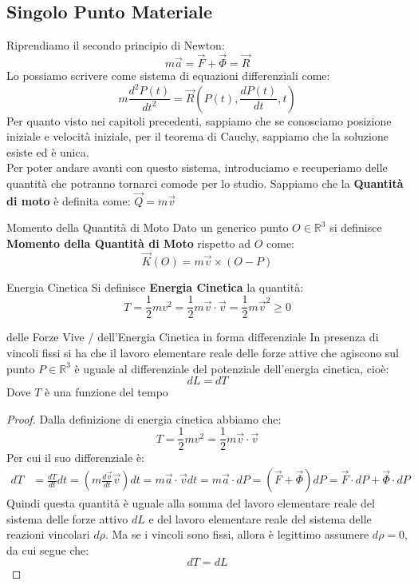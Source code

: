 \documentclass[11pt,a4paper,twoside]{article}
\theoremstyle{definition}
\begin{document}
\subsection{Singolo Punto Materiale}

Riprendiamo il secondo principio di Newton:
\[ m\vec a = \vec F + \vec \Phi = \vec R \]
Lo possiamo scrivere come sistema di equazioni differenziali come:
\[ m\frac{d^2P(t)}{dt^2}= \vec R\left( P(t), \frac{dP(t)}{dt}, t \right) \]
Per quanto visto nei capitoli precedenti, sappiamo che se conosciamo posizione iniziale e velocità iniziale, per il teorema di Cauchy, sappiamo che la soluzione esiste ed è unica.\\
Per poter andare avanti con questo sistema, introduciamo e recuperiamo delle quantità che potranno tornarci comode per lo studio. Sappiamo che la \textbf{Quantità di moto} è definita come: $\vec Q = m\vec v$

\begin{defn}{Momento della Quantità di Moto}{}
	Dato un generico punto $O \in \mathbb R^3$ si definisce \textbf{Momento della Quantità di Moto} rispetto ad $O$ come:
	\[ \vec K(O) = m\vec v \times (O-P) \]
\end{defn}

\begin{defn}{Energia Cinetica}{}
	Si definisce \textbf{Energia Cinetica} la quantità:
	\[ T = \frac 12 mv^2 = \frac 12 m \vec v \cdot \vec v = \frac 12 m \vec v^2 \geq 0 \]
\end{defn}

\begin{thm}{delle Forze Vive / dell'Energia Cinetica in forma differenziale}{}\label{Forze Vive}
	In presenza di vincoli fissi si ha che il lavoro elementare reale delle forze attive che agiscono sul punto $P \in \mathbb R^3$ è uguale al differenziale del potenziale dell'energia cinetica, cioè:
	\[ dL = dT \]
	Dove $T$ è una funzione del tempo
\end{thm}

\begin{proof}
	Dalla definizione di energia cinetica abbiamo che:
	\[ T = \frac 12 mv^2 = \frac 12 m\vec v\cdot \vec v\]
	Per cui il suo differenziale è:
	\begin{align*}
		dT &= \frac{dT}{dt}dt = \left( m \frac{d\vec v}{dt} \vec v \right)dt = m\vec a \cdot \vec v dt = m\vec a \cdot dP= (\vec F + \vec \Phi)dP = \vec F \cdot dP + \vec \Phi \cdot dP
	\end{align*}
	Quindi questa quantità è uguale alla somma del lavoro elementare reale del sistema delle forze attivo $dL$ e del lavoro elementare reale del sistema delle reazioni vincolari $d \rho$. Ma se i vincoli sono fissi, allora è legittimo assumere $d\rho = 0$, da cui segue che:
	\[ dT = dL \]
\end{proof}
\end{document}
